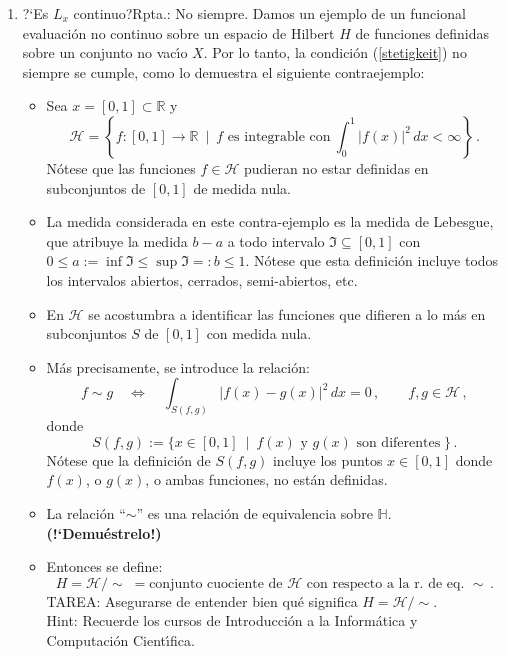 \begin{enumerate}

\item ?`Es $L_x$ continuo?\quad Rpta.: No siempre. 
Damos un ejemplo de un funcional evaluaci\'on no continuo sobre un
espacio de Hilbert $H$ de funciones definidas sobre un conjunto no
vac\'\i o $X$. Por lo tanto, la condici\'on (\ref{stetigkeit}) no
siempre se cumple, como lo demuestra el siguiente contraejemplo:

\begin{itemize}
\item
Sea $x =[0,1]\subset\mathbb{R}$ y 
$$
\mathcal{H} = \left\{ f:[0,1]\rightarrow\mathbb{R} \ \mid\ 
\text{$f$ es integrable con}\ \int_0^1|f(x)|^2\,dx<\infty\right\}\,.
$$
N\'otese que las funciones $f\in\mathcal{H}$ pudieran no estar definidas
en subconjuntos de $[0,1]$ de medida nula.

\item
La medida considerada en este contra-ejemplo es la medida de Lebesgue,
que atribuye la medida $b-a$ a todo intervalo
$\mathfrak{I}\subseteq[0,1]$ con 
$0\leq a:=\inf\mathfrak{I}\leq\sup\mathfrak{I}=:b\leq1$.
N\'otese que esta definici\'on incluye todos los intervalos abiertos,
cerrados, semi-abiertos, etc.

\item
En $\mathcal{H}$ se acostumbra a identificar las funciones que
difieren a lo m\'as en subconjuntos $S$ de $[0,1]$ con medida nula.

\item
M\'as precisamente, se introduce la relaci\'on:
$$
f\sim g \quad\Leftrightarrow\quad
\int_{S(f,g)} |f(x)-g(x)|^2\,dx=0\,,\qquad f,g\in\mathcal{H}\,,
$$
donde
$$
S(f,g):=\big\{ x\in[0,1]\ \mid\ 
\text{$f(x)$ y $g(x)$ son diferentes}\;\big\}\,.
$$
N\'otese que la definici\'on de $S(f,g)$ incluye los puntos
$x\in[0,1]$ donde $f(x)$, o $g(x)$, o ambas funciones, no est\'an
definidas.

\item
La relaci\'on ``$\sim$'' es una relaci\'on de equivalencia sobre
$\mathbb{H}$. {\bf (!`Demu\'estrelo!)}

\item
Entonces se define:
$$
H = \mathcal{H}/\!\!\sim\; 
= \text{conjunto cuociente de $\mathcal{H}$ 
        con respecto a la r. de eq. $\sim$}\,.
$$
TAREA: Asegurarse de entender bien qu\'e significa
$H = \mathcal{H}/\!\!\sim$. \\
Hint: Recuerde los cursos de Introducci\'on a
la Inform\'atica y Computaci\'on Cient\'\i fica.


\end{itemize}
\end{enumerate}
